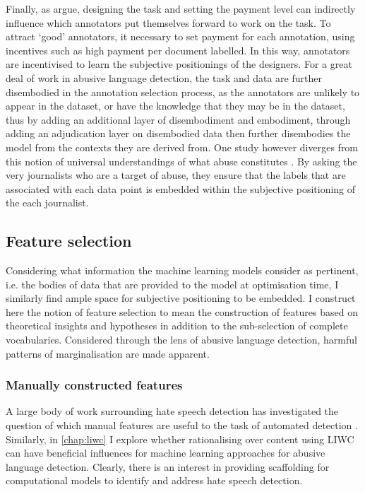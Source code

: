 Finally, as \citet{Sabou:2014} argue, designing the task and setting the payment level can indirectly influence which annotators put themselves forward to work on the task. To attract `good' annotators, it necessary to set payment for each annotation, using incentives such as high payment per document labelled. In this way, annotators are incentivised to learn the subjective positionings of the designers. For a great deal of work in abusive language detection, the task and data are further disembodied in the annotation selection process, as the annotators are unlikely to appear in the dataset, or have the knowledge that they may be in the dataset, thus by adding an additional layer of disembodiment and embodiment, through adding an adjudication layer on disembodied data then further disembodies the model from the contexts they are derived from. One study however diverges from this notion of universal understandings of what abuse constitutes \citep{Arora:2020}. By asking the very journalists who are a target of abuse, they ensure that the labels that are associated with each data point is embedded within the subjective positioning of the each journalist.


\subsection{Feature selection}

Considering what information the machine learning models consider as pertinent, i.e. the bodies of data that are provided to the model at optimisation time, I similarly find ample space for subjective positioning to be embedded. I construct here the notion of feature selection to mean the construction of features based on theoretical insights and hypotheses in addition to the sub-selection of complete vocabularies. Considered through the lens of abusive language detection, harmful patterns of marginalisation are made apparent.\vspace{5mm}

\subsubsection{Manually constructed features}

A large body of work surrounding hate speech detection has investigated the question of which manual features are useful to the task of automated detection \citep{Waseem:2016,Chiril:2019,Fortuna:2018,Stankovic:2020}. Similarly, in \autoref{chap:liwc} I explore whether rationalising over content using LIWC can have beneficial influences for machine learning approaches for abusive language detection. Clearly, there is an interest in providing scaffolding for computational models to identify and address hate speech detection.

